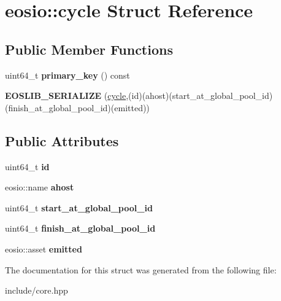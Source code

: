 \hypertarget{structeosio_1_1cycle}{}\section{eosio\+:\+:cycle Struct Reference}
\label{structeosio_1_1cycle}
\subsection*{Public Member Functions}
\begin{DoxyCompactItemize}
\item 
\mbox{\label{structeosio_1_1cycle_ad527a4353b708709d776313d6a550038}} 
uint64\+\_\+t {\bfseries primary\+\_\+key} () const
\item 
\mbox{\label{structeosio_1_1cycle_a8f09e7fe00c10d0ee66ffbeb8c82b230}} 
{\bfseries E\+O\+S\+L\+I\+B\+\_\+\+S\+E\+R\+I\+A\+L\+I\+ZE} (\mbox{\hyperlink{structeosio_1_1cycle}{cycle}},(id)(ahost)(start\+\_\+at\+\_\+global\+\_\+pool\+\_\+id)(finish\+\_\+at\+\_\+global\+\_\+pool\+\_\+id)(emitted))
\end{DoxyCompactItemize}
\subsection*{Public Attributes}
\begin{DoxyCompactItemize}
\item 
\mbox{\label{structeosio_1_1cycle_a32ad8c2c5dbc4b6d2cc72c726165ff93}} 
uint64\+\_\+t {\bfseries id}
\item 
\mbox{\label{structeosio_1_1cycle_a3d2c8a540edb0c71e606abe5742da06e}} 
eosio\+::name {\bfseries ahost}
\item 
\mbox{\label{structeosio_1_1cycle_a4a83c4e2b6c1c1a6a29e1c71643efc59}} 
uint64\+\_\+t {\bfseries start\+\_\+at\+\_\+global\+\_\+pool\+\_\+id}
\item 
\mbox{\label{structeosio_1_1cycle_a6619f70ab6b9927bd0133bd7569acd0c}} 
uint64\+\_\+t {\bfseries finish\+\_\+at\+\_\+global\+\_\+pool\+\_\+id}
\item 
\mbox{\label{structeosio_1_1cycle_adc8fa5d9cc298a56e5e5fbb332c197de}} 
eosio\+::asset {\bfseries emitted}
\end{DoxyCompactItemize}


The documentation for this struct was generated from the following file\+:\begin{DoxyCompactItemize}
\item 
include/core.\+hpp\end{DoxyCompactItemize}
